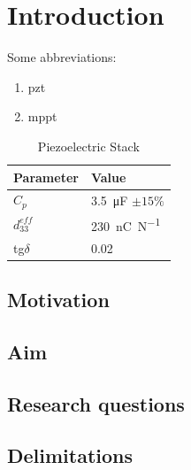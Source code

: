 

\chapter{Introduction}
\label{cha:introduction}

Some abbreviations:
\begin{enumerate}
    \item \gls{pzt}
    \item \gls{mppt}
\end{enumerate}


\lipsum[1-2]

\begin{table}
\centering
\caption{Piezoelectric Stack}
\begin{tabular}{ll}
Parameter & Value \\  \toprule
$C_p$ & \SI{3.5}{\micro \farad} $\pm 15\%$ \\ 
$d_{33}^{eff}$ & \SI{230}{\nano \coulomb \newton ^{-1}} \\ 
tg$\delta$ & 0.02 \\ 
\end{tabular}
  \label{tb:piezoStackProp}
\end{table}


\section{Motivation}
\label{sec:motivation}

\cite{Bader}

\lipsum[3-10]

\section{Aim}
\label{sec:aim}

\lipsum[1-2]
\section{Research questions}
\label{sec:research-questions}

\lipsum[1-2]



\section{Delimitations}
\label{sec:delimitations}

